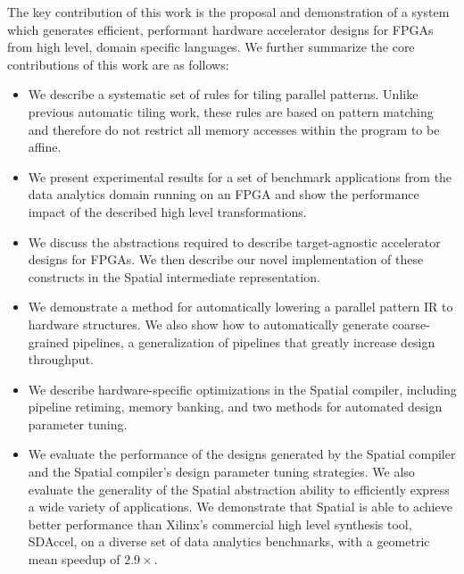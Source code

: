 The key contribution of this work is the proposal and demonstration of a system
which generates efficient, performant hardware accelerator designs
for FPGAs from high level, domain specific languages.
We further summarize the core contributions of this work are as follows:
\vspace{-5pt}
\begin{itemize}
  \item We describe a systematic set of rules for tiling parallel patterns.
  Unlike previous automatic tiling work, these rules are based on pattern matching
  and therefore do not restrict all memory accesses within the program to be affine.

  \vspace{5pt}

  \item We present experimental results for a set of benchmark applications
  from the data analytics domain running on an FPGA and show the performance impact of
  the described high level transformations.

  \vspace{5pt}

  \item We discuss the abstractions required to describe target-agnostic accelerator designs for FPGAs.
  We then describe our novel implementation of these constructs in the Spatial intermediate representation.

  \vspace{5pt}

  \item We demonstrate a method for automatically lowering a parallel pattern IR
  to hardware structures. We also show how to automatically generate coarse-grained pipelines, a
  generalization of pipelines that greatly increase design throughput.

  \vspace{5pt}

  \item We describe hardware-specific optimizations in the Spatial compiler, including
  pipeline retiming, memory banking, and two methods for automated design parameter tuning.

  \vspace{5pt}

  \item We evaluate the performance of the designs generated by the Spatial compiler
  and the Spatial compiler's design parameter tuning strategies. We also evaluate the generality of the Spatial abstraction ability to efficiently express a wide variety of applications.
  We demonstrate that Spatial is able to achieve better performance than Xilinx's commercial high level synthesis tool, SDAccel, on a diverse set of data analytics benchmarks, with a geometric mean speedup of $2.9\times$.
\end{itemize}

